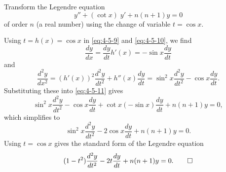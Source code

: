 \begin{example}
Transform the Legendre equation 
\begin{equation}\label{eq:4-5-12}
y''+ (\cot x) \;y' +n(n+1)y=0
\end{equation}
of order $n$ (a real number)   using the change of variable \(t = \cos x.\)
\end{example}
\begin{solution}
	Using $t = h(x) = \cos x$ in \eqref{eq:4-5-9} and \eqref{eq:4-5-10}, we find
	\[\frac{dy}{dx} = \frac{dy}{dt}h'(x) =-\sin x\frac{dy}{dt}\]
	and 
	\[	\frac{d^2y}{dx^2}  =\left(h'(x)\right)^2\frac{d^2y}{dt^2} + h''(x) \frac{dy}{dt} = \sin^2x \frac{d^2y}{dt^2} -\cos x\frac{dy}{dt} .\]
	Substituting these into \eqref{eq:4-5-11} gives
	\[\sin^2 x\frac{d^2y}{dt^2}-\cos x\frac{dy}{dt} +\cot x (-\sin x)\frac{dy}{dt}+  n (n+1)y= 0,\] which simplifies to 
		\[\sin^2 x\frac{d^2y}{dt^2}-2\cos x\frac{dy}{dt} +n (n+1)y= 0.\]  Using $t= \cos x$ gives the standard form of the Legendre equation
		\begin{equation*}\label{eq:4-5-13}
			(1-t^2)\frac{d^2y}{dt^2}- 2t\frac{dy}{dt}+ n(n+1)y = 0.\qedhere
		\end{equation*}
\end{solution}

